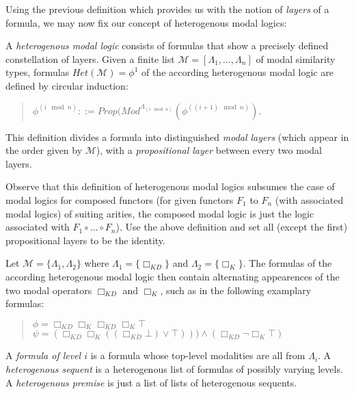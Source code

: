 \documentclass{entcs}
\begin{document}
Using the previous definition which provides us with the notion of \emph{layers} of a formula,
we may now fix our concept of heterogenous modal logics:

\begin{definition}
A \emph{heterogenous modal logic} consists of formulas that show a precisely defined constellation
of layers. Given a finite list $\mathcal{M}=[\Lambda_1,\ldots,\Lambda_n]$ of modal similarity
types, formulas $Het(\mathcal{M})=\phi^1$ of the according heterogenous modal logic are defined by circular induction:
\begin{quote}
$\phi^{(i \mod n)}::=Prop(Mod^{\Lambda_{(i\mod n)}}(\phi^{((i+1) \mod n)}).$
\end{quote}
\end{definition}
This definition divides a formula into distinguished \emph{modal layers} (which appear in the
order given by $\mathcal{M}$), with a
\emph{propositional layer} between every two modal layers.
\begin{remark}
Observe that this definition of heterogenous modal logics subsumes the case of modal logics
for composed functors (for given functors $F_1$ to $F_n$ (with associated modal logics)
of suiting arities, the composed modal logic is just the logic associated with
$F_1\circ\ldots\circ F_n$).
Use the above definition and set all (except the first) propositional layers to be the
identity.
\end{remark}

\begin{example}
Let $\mathcal{M}=\{\Lambda_1,\Lambda_2\}$ where $\Lambda_1=\{\Box_{KD}\}$ and
$\Lambda_2=\{\Box_{K}\}$. The formulas of the according heterogenous modal logic
then contain alternating appearences of the two modal operators $\Box_{KD}$ and
$\Box_{K}$, such as in the following examplary formulas:
\begin{quote}
$\phi=\Box_{KD}\Box_{K}\Box_{KD}\Box_{K}\top$\\
$\psi=(\Box_{KD} \Box_{K} ((\Box_{KD} \bot) \vee \top)))\wedge(\Box_{KD}\neg \Box_{K} \top)$
\end{quote}
\end{example}

\begin{definition}
A \emph{formula of level $i$} is a formula whose top-level modalities are all from $\Lambda_i$.
A \emph{heterogenous sequent} is a heterogenous list of formulas of possibly varying levels. 
A \emph{heterogenous premise} is just a list of lists of heterogenous sequents.
\end{definition}
\end{document}
